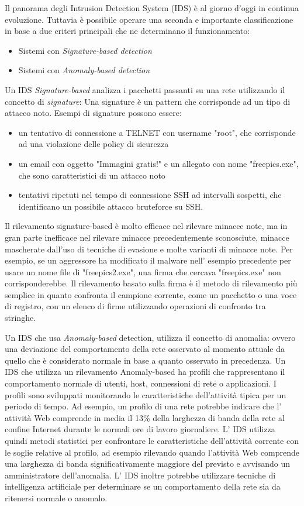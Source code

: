 \documentclass[12pt,a4paper,openright,twoside]{report}
\begin{document}
Il panorama degli Intrusion Detection System (IDS) \`e al giorno d'oggi in continua evoluzione.
Tuttavia \`e possibile operare una seconda e importante classificazione in base a due criteri
principali che ne determinano il funzionamento:
\begin{itemize}
  \item Sistemi con {\it Signature-based detection}
  \item Sistemi con {\it Anomaly-based detection}
\end{itemize}

Un IDS {\it Signature-based } analizza i pacchetti passanti su una rete utilizzando il concetto di {\it signature}:
Una signature \`e un pattern che corrisponde ad un tipo di attacco noto. \cite{K7}
Esempi di signature possono essere:
\begin{itemize}
  \item un tentativo di connessione a TELNET con username "root", che corrisponde
  ad una violazione delle policy di sicurezza
  \item un email con oggetto "Immagini gratis!" e un allegato con nome "freepics.exe",
  che sono caratteristici di un attacco noto
  \item tentativi ripetuti nel tempo di connessione SSH ad intervalli sospetti,
  che identificano un possibile attacco bruteforce su SSH.
\end{itemize}
Il rilevamento signature-based \`e molto efficace nel rilevare minacce note,
ma in gran parte inefficace nel rilevare minacce precedentemente sconosciute,
minacce mascherate dall'uso di tecniche di evasione e molte varianti di minacce note.
 Per esempio, se un aggressore ha modificato il malware nell' esempio precedente per
 usare un nome file di "freepics2.exe", una firma che cercava "freepics.exe" non
 corrisponderebbe.
Il rilevamento basato sulla firma \`e il metodo di rilevamento pi\`u semplice in
quanto confronta il campione corrente, come un pacchetto o una voce di registro,
con un elenco di firme utilizzando operazioni di confronto tra stringhe.

Un IDS che usa {\it Anomaly-based} detection, utilizza il concetto di anomalia:
ovvero una deviazione del comportamento della rete osservato al momento attuale da quello
che \`e considerato normale in base a quanto osservato in precedenza.
Un IDS che utilizza un rilevamento Anomaly-based ha profili che rappresentano
il comportamento normale di utenti, host, connessioni di rete o applicazioni.
I profili sono sviluppati monitorando le caratteristiche dell'attivit\`a tipica
per un periodo di tempo.  Ad esempio, un profilo di una rete potrebbe indicare
che l' attivit\`a Web comprende in media il 13\% della larghezza di banda della
rete al confine Internet durante le normali ore di lavoro giornaliere.
 L' IDS utilizza quindi metodi statistici per confrontare le caratteristiche dell'attivit\`a
  corrente con le soglie relative al profilo, ad esempio rilevando quando l'attivit\`a
  Web comprende una larghezza di banda significativamente maggiore del previsto
  e avvisando un amministratore dell'anomalia.
L' IDS inoltre potrebbe utilizzare tecniche di intelligenza artificiale per determinare
se un comportamento della rete sia da ritenersi normale o anomalo.
\end{document}
